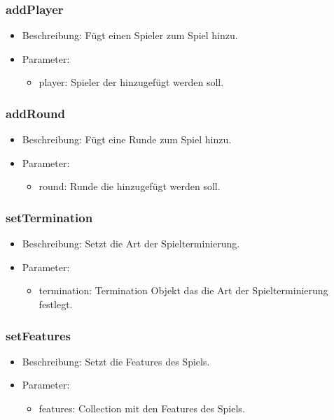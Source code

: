 \documentclass[a4paper]{scrreprt}
\begin{document}
    \subsubsection{addPlayer}
    \begin{itemize}
        \item Beschreibung: Fügt einen Spieler zum Spiel hinzu.
        \item Parameter:
        \begin{itemize}
            \item player: Spieler der hinzugefügt werden soll.
        \end{itemize}
    \end{itemize}

    \subsubsection{addRound}
    \begin{itemize}
        \item Beschreibung: Fügt eine Runde zum Spiel hinzu.
        \item Parameter:
        \begin{itemize}
            \item round: Runde die hinzugefügt werden soll.
        \end{itemize}
    \end{itemize}

    \subsubsection{setTermination}
    \begin{itemize}
        \item Beschreibung: Setzt die Art der Spielterminierung.
        \item Parameter:
        \begin{itemize}
            \item termination: Termination Objekt das die Art der Spielterminierung festlegt.
        \end{itemize}
    \end{itemize}

    \subsubsection{setFeatures}
    \begin{itemize}
        \item Beschreibung: Setzt die Features des Spiels.
        \item Parameter:
        \begin{itemize}
            \item features: Collection mit den Features des Spiels.
        \end{itemize}
    \end{itemize}
\end{document}
